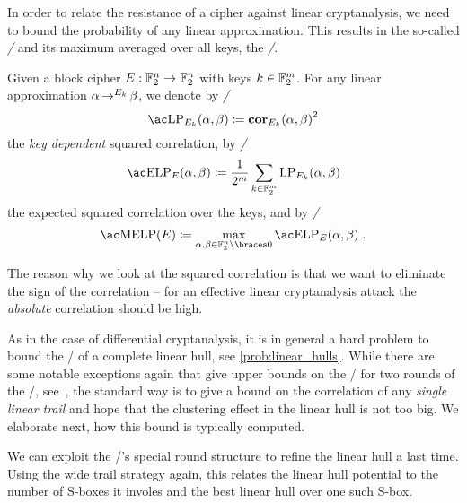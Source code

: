 In order to relate the resistance of a cipher against linear cryptanalysis, we need to bound the probability of any linear approximation.
This results in the so-called \emph{\LPl/} and its maximum averaged over all keys, the \emph{\MELPl/}.
\begin{definition}\label{def:lp-elp-melp}
    Given a block cipher $E : \mathbb{F}_2^n \to \mathbb{F}_2^n$ with keys $k \in \mathbb{F}_2^m$.
    For any linear approximation $\alpha \operatorname*{\rightarrow}^{E_k}_{} \beta$, we denote by \emph{\LPf/}
    \begin{equation*}
        \mathrm{\LP/}_{E_k}(\alpha, \beta) \coloneqq {\cor_{E_k}(\alpha, \beta)}^2
    \end{equation*}
    the \emph{key dependent} squared correlation, by \emph{\ELPf/}
    \begin{equation*}
        \mathrm{\ELP/}_E(\alpha, \beta) \coloneqq \frac{1}{2^m} \sum_{k \in \F_2^m} \mathrm{LP}_{E_k}(\alpha, \beta)
    \end{equation*}
    the expected squared correlation over the keys, and by \emph{\MELPf/}
    \begin{equation*}
        \mathrm{\MELP/}(E) \coloneqq \max_{\alpha, \beta \in \F_2^n\setminus\set{0}} \mathrm{\ELP/}_E(\alpha, \beta)\;.
    \end{equation*}
\end{definition}
The reason why we look at the squared correlation is that we want to eliminate the sign of the correlation -- for an effective linear cryptanalysis attack the \emph{absolute} correlation should be high.

As in the case of differential cryptanalysis, it is in general a hard problem to bound the \MELP/ of a complete linear hull, see \cref{prob:linear_hulls}.
While there are some notable exceptions again that give upper bounds on the \MELP/ for two rounds of the \AES/, see~, the standard way is to give a bound on the correlation of any \emph{single linear trail} and hope that the clustering effect in the linear hull is not too big.
We elaborate next, how this bound is typically computed.

We can exploit the \SPN/'s special round structure to refine the linear hull a last time.
Using the wide trail strategy again, this relates the linear hull potential to the number of S-boxes it involes and the best linear hull over one such S-box.

